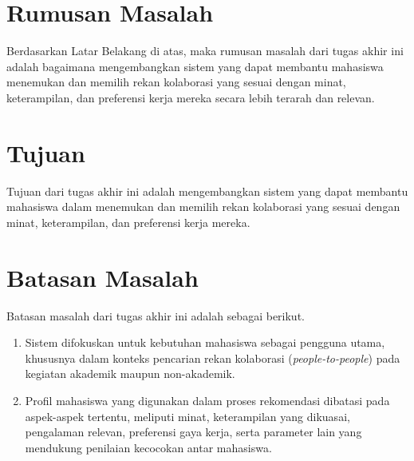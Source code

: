 \section{Rumusan Masalah}
Berdasarkan Latar Belakang di atas, maka rumusan masalah dari tugas akhir ini adalah bagaimana mengembangkan sistem yang dapat membantu mahasiswa menemukan dan memilih rekan kolaborasi yang sesuai dengan minat, keterampilan, dan preferensi kerja mereka secara lebih terarah dan relevan.


\section{Tujuan}
Tujuan dari tugas akhir ini adalah mengembangkan sistem yang dapat membantu mahasiswa dalam menemukan dan memilih rekan kolaborasi yang sesuai dengan minat, keterampilan, dan preferensi kerja mereka.


\section{Batasan Masalah}
Batasan masalah dari tugas akhir ini adalah sebagai berikut.
\begin{enumerate}
    \item Sistem difokuskan untuk kebutuhan mahasiswa sebagai pengguna utama, khususnya dalam konteks pencarian rekan kolaborasi (\textit{people-to-people}) pada kegiatan akademik maupun non-akademik.
    \item Profil mahasiswa yang digunakan dalam proses rekomendasi dibatasi pada aspek-aspek tertentu, meliputi minat, keterampilan yang dikuasai, pengalaman relevan, preferensi gaya kerja, serta parameter lain yang mendukung penilaian kecocokan antar mahasiswa.
\end{enumerate}

